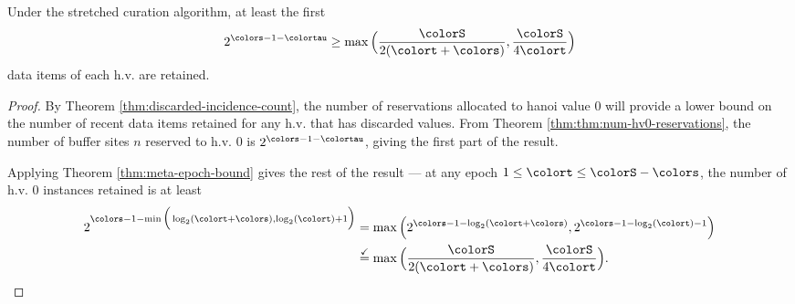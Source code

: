 \begin{lemma}
\label{thm:stretched-reservation-count}
Under the stretched curation algorithm, at least the first
\begin{align*}
2^{\colors - 1 - \colortau}
\geq
\max\Big(
  \frac{\colorS}{2(\colort + \colors)},
  \frac{\colorS}{4\colort}
\Big)
\end{align*}
data items of each h.v. are retained.
\end{lemma}
\begin{proof}

By Theorem \ref{thm:discarded-incidence-count}, the number of reservations allocated to hanoi value 0 will provide a lower bound on the number of recent data items retained for any h.v. that has discarded values.
From Theorem \ref{thm:thm:num-hv0-reservations}, the number of buffer sites $n$ reserved to h.v. 0 is $2^{\colors-1-\colortau}$, giving the first part of the result.

Applying Theorem \ref{thm:meta-epoch-bound} gives the rest of the result --- at any epoch $1 \leq \colort \leq \colorS - \colors$, the number of h.v. 0 instances retained is at least
\begin{align*}
2^{\colors - 1 - \min\Big(
  \log_2(\colort + \colors),
  \log_2(\colort) + 1
\Big)}
&= \max\Big(
  2^{\colors - 1 - \log_2(\colort + \colors)},
  2^{\colors - 1 - \log_2(\colort) - 1}
\Big)\\
&\stackrel{\checkmark}{=} \max\Big(
  \frac{\colorS}{2(\colort + \colors)},
  \frac{\colorS}{4\colort}
\Big).
\end{align*}

\end{proof}
